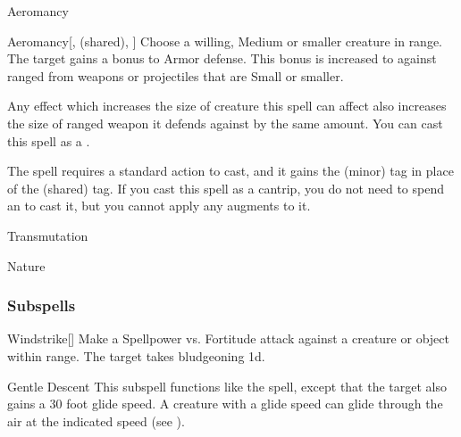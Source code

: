 
\begin{spellsection}{Aeromancy}

\begin{spellheader}
\end{spellheader}


\begin{ability}{Aeromancy}[,  (shared), ]
Choose a willing, Medium or smaller creature in \rngclose range.
The target gains a  bonus to Armor defense.
This bonus is increased to  against ranged  from weapons or projectiles that are Small or smaller.

Any effect which increases the size of creature this spell can affect also increases the size of ranged weapon it defends against by the same amount.
You can cast this spell as a .
\end{ability}



 The spell requires a standard action to cast, and it gains the  (minor) tag in place of the  (shared) tag. If you cast this spell as a cantrip,
you do not need to spend an  to cast it,
but you cannot apply any augments to it.


 Transmutation

 Nature
\end{spellsection}


\subsubsection{Subspells}


\begin{ability}[\nth{1}]{Windstrike}[]
Make a Spellpower vs. Fortitude attack against a creature or object within \rngmed range.
\hit The target takes bludgeoning  \plus1d.
\end{ability}
\vspace{0.25em}


\begin{ability}[\nth{2}]{Gentle Descent}
This subspell functions like the  spell, except that the target also gains a 30 foot glide speed.
A creature with a glide speed can glide through the air at the indicated speed (see ).
\end{ability}
\vspace{0.25em}


